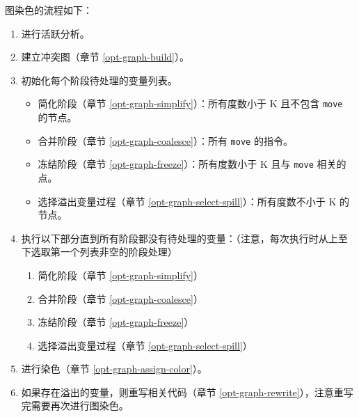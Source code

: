 图染色的流程如下：
\begin{enumerate}
  \item 进行活跃分析。

  \item 建立冲突图（章节 \ref{opt-graph-build}）。

  \item 初始化每个阶段待处理的变量列表。
    \begin{itemize}
      \item 简化阶段（章节 \ref{opt-graph-simplify}）：所有度数小于 K 且不包含 \texttt{move} 的节点。
      \item 合并阶段（章节 \ref{opt-graph-coalesce}）：所有 \texttt{move} 的指令。
      \item 冻结阶段（章节 \ref{opt-graph-freeze}）：所有度数小于 K 且与 \texttt{move} 相关的点。
      \item 选择溢出变量过程（章节 \ref{opt-graph-select-spill}）：所有度数不小于 K 的节点。
    \end{itemize}

  \item 执行以下部分直到所有阶段都没有待处理的变量：（注意，每次执行时从上至下选取第一个列表非空的阶段处理）
    \begin{enumerate}
      \item 简化阶段（章节 \ref{opt-graph-simplify}）
      \item 合并阶段（章节 \ref{opt-graph-coalesce}）
      \item 冻结阶段（章节 \ref{opt-graph-freeze}）
      \item 选择溢出变量过程（章节 \ref{opt-graph-select-spill}）
    \end{enumerate}

  \item 进行染色（章节 \ref{opt-graph-assign-color}）。

  \item 如果存在溢出的变量，则重写相关代码（章节 \ref{opt-graph-rewrite}），注意重写完需要再次进行图染色。
\end{enumerate}

